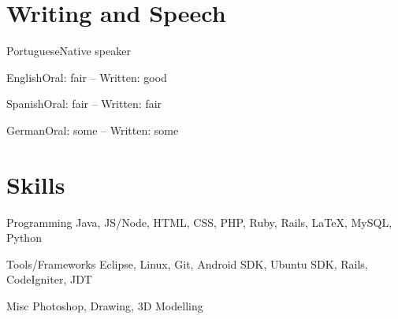 \documentclass{tccv}
\begin{document}
\section{Writing and Speech}
\begin{factlist}
\item{Portuguese}{Native speaker}
\item{English}{Oral: fair -- Written: good}
\item{Spanish}{Oral: fair -- Written: fair}
\item{German}{Oral: some -- Written: some}
\end{factlist}

\section{Skills}
\begin{factlist}
\item{Programming}
    {Java, JS/Node, HTML, CSS, PHP, Ruby, Rails, \LaTeX, MySQL, Python}

\item{Tools/Frameworks}
    {Eclipse, Linux, Git, Android SDK, Ubuntu SDK, Rails, CodeIgniter, JDT}

\item{Misc}
    {Photoshop, Drawing, 3D Modelling}

\end{factlist}
\end{document}
